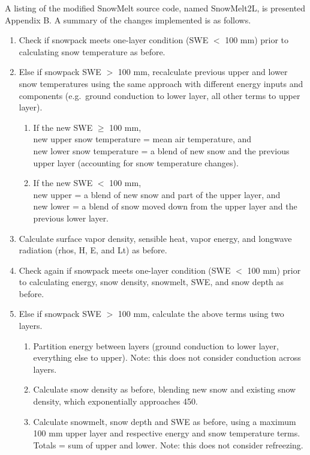 \documentclass[12pt]{article}
\begin{document}
A listing of the modified SnowMelt source code, named SnowMelt2L, is presented Appendix B.
A summary of the changes implemented is as follows.
\begin{enumerate}
  \item Check if snowpack meets one-layer condition (SWE $<$ 100 mm) prior to calculating snow temperature as before.
  \item Else if snowpack SWE $>$ 100 mm, recalculate previous upper and lower snow temperatures using the same approach with different energy inputs and components (e.g.\ ground conduction to lower layer, all other terms to upper layer).
  \begin{enumerate}
    \item If the new SWE $\geq$ 100 mm, \\
    new upper snow temperature = mean air temperature, and \\
    new lower snow temperature = a blend of new snow and the previous upper layer (accounting for snow temperature changes).
    \item If the new SWE $<$ 100 mm, \\
    new upper = a blend of new snow and part of the upper layer, and \\
    new lower = a blend of snow moved down from the upper layer and the previous lower layer.
  \end{enumerate}
  \item Calculate surface vapor density, sensible heat, vapor energy, and longwave radiation (rhos, H, E, and Lt) as before.
  \item Check again if snowpack meets one-layer condition (SWE $<$ 100 mm) prior to calculating energy, snow density, snowmelt, SWE, and snow depth as before.
  \item Else if snowpack SWE $>$ 100 mm, calculate the above terms using two layers.
  \begin{enumerate}
    \item Partition energy between layers (ground conduction to lower layer, everything else to upper). Note: this does not consider conduction across layers.
    \item Calculate snow density as before, blending new snow and existing snow density, which exponentially approaches 450.
    \item Calculate snowmelt, snow depth and SWE as before, using a maximum 100 mm upper layer and respective energy and snow temperature terms. Totals = sum of upper and lower. Note: this does not consider refreezing.
  \end{enumerate}
\end{enumerate}
\end{document}
